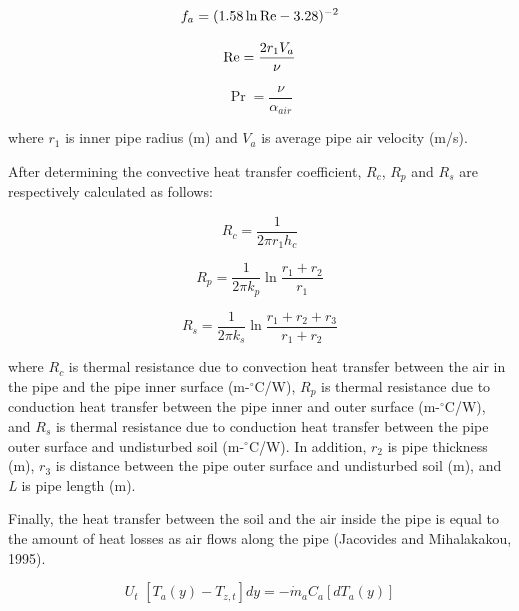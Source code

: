 \begin{equation}
{f_a} = {(1.58\ln {\mathop{\rm Re}\nolimits}  - 3.28)^{ - 2}}
\end{equation}

\begin{equation}
  \mathop{\rm Re}\nolimits  = \frac{{2{r_1}{V_a}}}{\nu }
\end{equation}

\begin{equation}
\Pr  = \frac{\nu }{{{\alpha_{air}}}}
\end{equation}

where \(r_{1}\) is inner pipe radius (m) and \(V_{a}\) is average pipe air velocity (m/s).

After determining the convective heat transfer coefficient, \(R_{c}\), \(R_{p}\) and \(R_{s}\) are respectively calculated as follows:

\begin{equation}
{R_c} = \frac{1}{{2\pi {r_1}{h_c}}}
\end{equation}

\begin{equation}
{R_p} = \frac{1}{{2\pi {k_p}}}\ln \frac{{{r_1} + {r_2}}}{{{r_1}}}
\end{equation}

\begin{equation}
{R_s} = \frac{1}{{2\pi {k_s}}}\ln \frac{{{r_1} + {r_2} + {r_3}}}{{{r_1} + {r_2}}}
\end{equation}

where \(R_{c}\) is thermal resistance due to convection heat transfer between the air in the pipe and the pipe inner surface (m-\(^{\circ}\)C/W), \(R_{p}\) is thermal resistance due to conduction heat transfer between the pipe inner and outer surface (m-\(^{\circ}\)C/W), and \(R_{s}\) is thermal resistance due to conduction heat transfer between the pipe outer surface and undisturbed soil (m-\(^{\circ}\)C/W). In addition, \(r_{2}\) is pipe thickness (m), \(r_{3}\) is distance between the pipe outer surface and undisturbed soil (m), and \emph{L} is pipe length (m).

Finally, the heat transfer between the soil and the air inside the pipe is equal to the amount of heat losses as air flows along the pipe (Jacovides and Mihalakakou, 1995).

\begin{equation}
{U_t}\,\,\left[ {{T_a}(y) - {T_{z,t}}} \right]dy =  - {\dot m_a}{C_a}\left[ {d{T_a}(y)} \right]
\end{equation}

